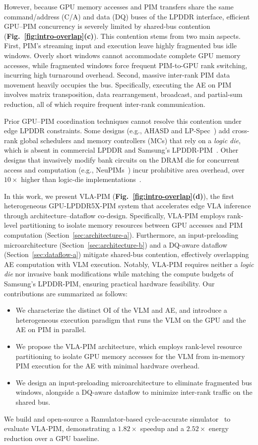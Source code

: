 However, because GPU memory accesses and PIM transfers share the same command/address (C/A) and data (DQ) buses of the LPDDR interface, efficient GPU--PIM concurrency is severely limited by shared-bus contention (\textbf{Fig.~\ref{fig:intro-overlap}(c)}). This contention stems from two main aspects. First, PIM's streaming input and execution leave highly fragmented bus idle windows. Overly short windows cannot accommodate complete GPU memory accesses, while fragmented windows force frequent PIM-to-GPU rank switching, incurring high turnaround overhead. Second, massive inter-rank PIM data movement heavily occupies the bus. Specifically, executing the AE on PIM involves matrix transposition, data rearrangement, broadcast, and partial-sum reduction, all of which require frequent inter-rank communication.

Prior GPU--PIM coordination techniques cannot resolve this contention under edge LPDDR constraints. Some designs (e.g., AHASD and LP-Spec~\cite{ahasd,lp_spec}) add cross-rank global schedulers and memory controllers (MCs) that rely on a \emph{logic die}, which is absent in commercial LPDDR and Samsung's LPDDR-PIM~\cite{samsung_lpddr5x_pim}. Other designs that invasively modify bank circuits on the DRAM die for concurrent access and computation (e.g., NeuPIMs~\cite{neupims}) incur prohibitive area overhead, over $10\times$ higher than logic-die implementations~\cite{sangam,devaux}.

In this work, we present VLA-PIM (\textbf{Fig.~\ref{fig:intro-overlap}(d)}), the first heterogeneous GPU-LPDDR5X-PIM system that accelerates edge VLA inference through architecture--dataflow co-design. Specifically, VLA-PIM employs rank-level partitioning to isolate memory resources between GPU accesses and PIM computation (Section~\ref{sec:architecture-a}). Furthermore, an input-preloading microarchitecture (Section~\ref{sec:architecture-b}) and a DQ-aware dataflow (Section~\ref{sec:dataflow-a}) mitigate shared-bus contention, effectively overlapping AE computation with VLM execution. Notably, VLA-PIM requires neither a \emph{logic die} nor invasive bank modifications while matching the compute budgets of Samsung's LPDDR-PIM, ensuring practical hardware feasibility. Our contributions are summarized as follows:

\begin{itemize}
\item We characterize the distinct OI of the VLM and AE, and introduce a heterogeneous execution paradigm that runs the VLM on the GPU and the AE on PIM in parallel.
\item We propose the VLA-PIM architecture, which employs rank-level resource partitioning to isolate GPU memory accesses for the VLM from in-memory PIM execution for the AE with minimal hardware overhead.
\item We design an input-preloading microarchitecture to eliminate fragmented bus windows, alongside a DQ-aware dataflow to minimize inter-rank traffic on the shared bus.
\end{itemize}

We build and open-source a Ramulator-based cycle-accurate simulator~\cite{ramulator2} to evaluate VLA-PIM, demonstrating a $1.82\times$ speedup and a $2.52\times$ energy reduction over a GPU baseline.
